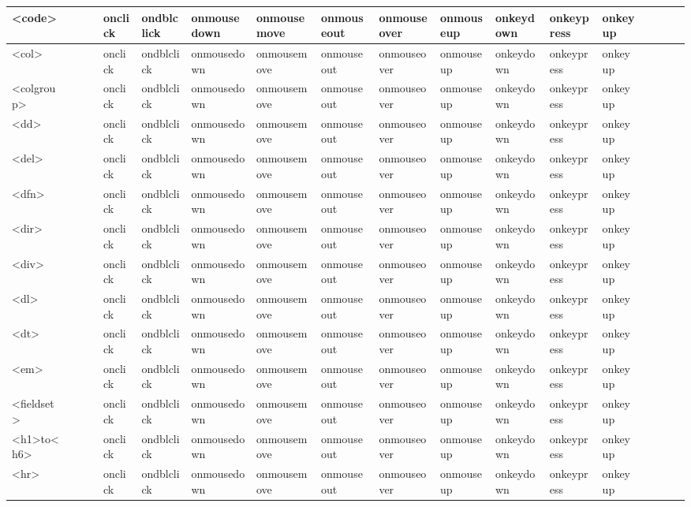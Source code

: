 \begin{longtable}{|p{18pt}|p{15pt}|p{15pt}|p{10pt}|p{16pt}|p{16pt}|p{16pt}|p{16pt}|p{16pt}|p{16pt}|p{16pt}|p{16pt}|p{16pt}|p{16pt}|p{16pt}|p{16pt}|p{16pt}|p{16pt}|}
\hline
<code>		&	&	&	& onclick	& ondblclick & onmousedown & onmousemove & onmouseout & onmouseover & onmouseup & onkeydown & onkeypress & onkeyup & & & & \\
\hline
<col>		&	&	&	& onclick	& ondblclick & onmousedown & onmousemove & onmouseout & onmouseover & onmouseup & onkeydown & onkeypress & onkeyup & & & & \\
\hline
<colgroup>	&	&	&	& onclick	& ondblclick & onmousedown & onmousemove & onmouseout & onmouseover & onmouseup & onkeydown & onkeypress & onkeyup & & & & \\
\hline
<dd>		&	&	&	& onclick	& ondblclick & onmousedown & onmousemove & onmouseout & onmouseover & onmouseup & onkeydown & onkeypress & onkeyup & & & & \\
\hline
<del>		&	&	&	& onclick	& ondblclick & onmousedown & onmousemove & onmouseout & onmouseover & onmouseup & onkeydown & onkeypress & onkeyup & & & & \\
\hline
<dfn>		&	&	&	& onclick	& ondblclick & onmousedown & onmousemove & onmouseout & onmouseover & onmouseup & onkeydown & onkeypress & onkeyup & & & & \\
\hline
<dir>		&	&	&	& onclick	& ondblclick & onmousedown & onmousemove & onmouseout & onmouseover & onmouseup & onkeydown & onkeypress & onkeyup & & & & \\
\hline
<div>		&	&	&	& onclick	& ondblclick & onmousedown & onmousemove & onmouseout & onmouseover & onmouseup & onkeydown & onkeypress & onkeyup & & & & \\
\hline
<dl>			&	&	&	& onclick	& ondblclick & onmousedown & onmousemove & onmouseout & onmouseover & onmouseup & onkeydown & onkeypress & onkeyup & & & & \\
\hline
<dt>			&	&	&	& onclick	& ondblclick & onmousedown & onmousemove & onmouseout & onmouseover & onmouseup & onkeydown & onkeypress & onkeyup & & & & \\
\hline
<em>		&	&	&	& onclick	& ondblclick & onmousedown & onmousemove & onmouseout & onmouseover & onmouseup & onkeydown & onkeypress & onkeyup & & & & \\
\hline
<fieldset>	&	&	&	& onclick	& ondblclick & onmousedown & onmousemove & onmouseout & onmouseover & onmouseup & onkeydown & onkeypress & onkeyup & & & & \\
\hline
<h1>to<h6>	&	&	&	& onclick	& ondblclick & onmousedown & onmousemove & onmouseout & onmouseover & onmouseup & onkeydown & onkeypress & onkeyup & & & & \\
\hline
<hr>			&	&	&	& onclick	& ondblclick & onmousedown & onmousemove & onmouseout & onmouseover & onmouseup & onkeydown & onkeypress & onkeyup & & & & \\

\end{longtable}
